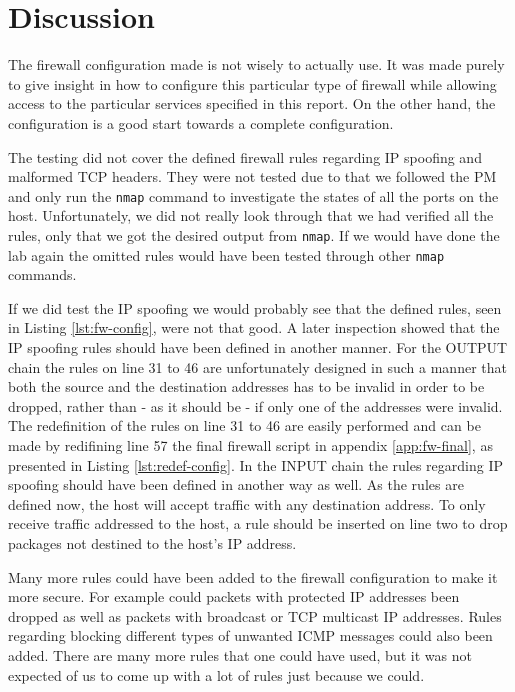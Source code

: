 \section{Discussion} 
\label{sec:discussion}

The firewall configuration made is not wisely to actually use. It was made purely to give insight in how to configure this particular type of firewall while allowing access to the particular services specified in this report. On the other hand, the configuration is a good start towards a complete configuration.

The testing did not cover the defined firewall rules regarding IP spoofing and malformed TCP headers. They were not tested due to that we followed the \lab{} PM and only run the \texttt{nmap} command to investigate the states of all the ports on the host. Unfortunately, we did not really look through that we had verified all the rules, only that we got the desired output from \texttt{nmap}. If we would have done the lab again the omitted rules would have been tested through other \texttt{nmap} commands. 

If we did test the IP spoofing we would probably see that the defined rules, seen in Listing \ref{lst:fw-config}, were not that good. A later inspection showed that the IP spoofing rules should have been defined in another manner. For the OUTPUT chain the rules on line 31 to 46 are unfortunately designed in such a manner that both the source and the destination addresses has to be invalid in order to be dropped, rather than - as it should be - if only one of the addresses were invalid. The redefinition of the rules on line 31 to 46 are easily performed and can be made by redifining line 57 the final firewall script in appendix \ref{app:fw-final}, as presented in Listing \ref{lst:redef-config}. In the INPUT chain the rules regarding IP spoofing should have been defined in another way as well. As the rules are defined now, the host will accept traffic with any destination address. To only receive traffic addressed to the host, a rule should be inserted on line two to drop packages not destined to the host's IP address.

Many more rules could have been added to the firewall configuration to make it more secure. For example could packets with protected IP addresses been dropped as well as packets with broadcast or TCP multicast IP addresses. Rules regarding blocking different types of unwanted ICMP messages could also been added. There are many more rules that one could have used, but it was not expected of us to come up with a lot of rules just because we could. 


